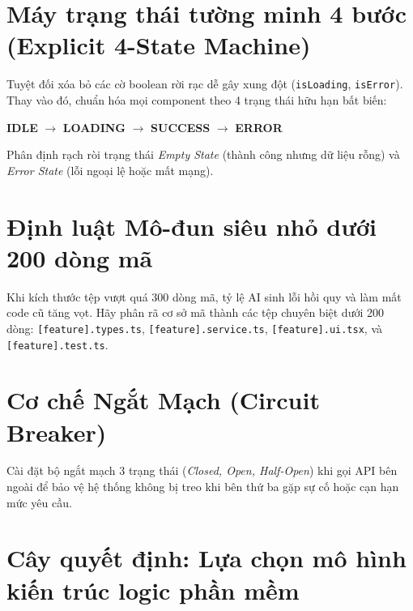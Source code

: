 \documentclass[a4paper,11pt]{report}
\begin{document}
\section{Máy trạng thái tường minh 4 bước (Explicit 4-State Machine)}
Tuyệt đối xóa bỏ các cờ boolean rời rạc dễ gây xung đột (\texttt{isLoading}, \texttt{isError}). Thay vào đó, chuẩn hóa mọi component theo 4 trạng thái hữu hạn bất biến:
\begin{center}
\textbf{IDLE} $\longrightarrow$ \textbf{LOADING} $\longrightarrow$ \textbf{SUCCESS} $\longrightarrow$ \textbf{ERROR}
\end{center}
Phân định rạch ròi trạng thái \textit{Empty State} (thành công nhưng dữ liệu rỗng) và \textit{Error State} (lỗi ngoại lệ hoặc mất mạng).

\section{Định luật Mô-đun siêu nhỏ dưới 200 dòng mã}
Khi kích thước tệp vượt quá 300 dòng mã, tỷ lệ AI sinh lỗi hồi quy và làm mất code cũ tăng vọt. Hãy phân rã cơ sở mã thành các tệp chuyên biệt dưới 200 dòng: \texttt{[feature].types.ts}, \texttt{[feature].service.ts}, \texttt{[feature].ui.tsx}, và \texttt{[feature].test.ts}.

\section{Cơ chế Ngắt Mạch (Circuit Breaker)}
Cài đặt bộ ngắt mạch 3 trạng thái (\textit{Closed, Open, Half-Open}) khi gọi API bên ngoài để bảo vệ hệ thống không bị treo khi bên thứ ba gặp sự cố hoặc cạn hạn mức yêu cầu.

\section{Cây quyết định: Lựa chọn mô hình kiến trúc logic phần mềm}
\end{document}
